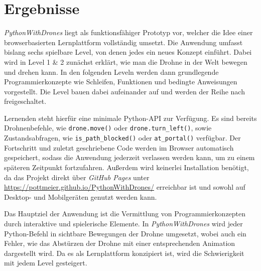 \documentclass[a4paper,12pt]{article}
\begin{document}
	\section{Ergebnisse}
	\textit{PythonWithDrones} liegt als funktionsfähiger Prototyp vor, welcher die Idee einer 
	browserbasierten Lernplattform vollständig umsetzt. Die Anwendung umfasst bislang sechs 
	spielbare Level, von denen jedes ein neues Konzept einführt. Dabei wird in Level 1 \& 2 zunächst 
	erklärt, wie man die Drohne in der Welt bewegen und drehen kann. 
	In den folgenden Leveln werden dann grundlegende Programmierkonzepte wie Schleifen, 
	Funktionen und bedingte Anweisungen vorgestellt. Die Level 
	bauen dabei aufeinander auf und werden der Reihe nach freigeschaltet.

	Lernenden steht hierfür eine minimale Python-API zur Verfügung. Es sind bereits 
	Drohnenbefehle, wie \texttt{drone.move()} oder \texttt{drone.turn\_left()}, sowie 
	Zustandsabfragen, wie \texttt{is\_path\_blocked()} oder \texttt{at\_portal()} verfügbar.
	Der Fortschritt und zuletzt geschriebene Code werden im Browser automatisch gespeichert, 
	sodass die Anwendung jederzeit verlassen werden kann, um zu einem späteren Zeitpunkt 
	fortzufahren. Außerdem wird keinerlei Installation benötigt, da das Projekt direkt über 
	\textit{GitHub Pages} unter \url{https://pottmeier.github.io/PythonWithDrones/} erreichbar 
	ist und sowohl auf Desktop- und Mobilgeräten genutzt werden kann.

	Das Hauptziel der Anwendung ist die Vermittlung von Programmierkonzepten durch 
	interaktive und spielerische Elemente. In \textit{PythonWithDrones} wird jeder 
	Python-Befehl in sichtbare Bewegungen der Drohne umgesetzt, wobei auch ein Fehler, wie 
	das Abstürzen der Drohne mit einer entsprechenden Animation dargestellt wird. Da 
	es als Lernplattform konzipiert ist, wird die Schwierigkeit mit jedem Level gesteigert.   

\end{document}
